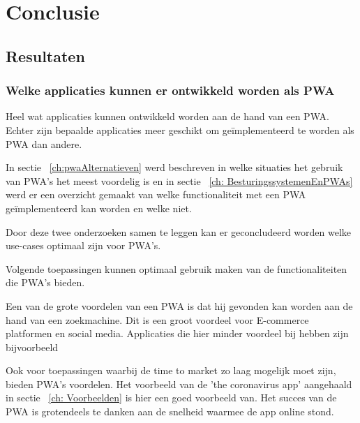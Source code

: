\chapter{Conclusie}
\label{ch:conclusie}

	  

\section{Resultaten}

	\subsection{Welke applicaties kunnen er ontwikkeld worden als PWA}
	
		Heel wat applicaties kunnen ontwikkeld worden aan de hand van een PWA. Echter zijn bepaalde applicaties meer geschikt om geïmplementeerd te worden als PWA dan andere.
		
		In sectie ~\ref{ch:pwaAlternatieven} werd beschreven in welke situaties het gebruik van PWA's het meest voordelig is en in sectie ~\ref{ch: BesturingssystemenEnPWAs} werd er een overzicht gemaakt van welke functionaliteit met een PWA geïmplementeerd kan worden en welke niet.
		
		Door deze twee onderzoeken samen te leggen kan er geconcludeerd worden welke use-cases optimaal zijn voor PWA's.
		
		Volgende toepassingen kunnen optimaal gebruik maken van de functionaliteiten die PWA's bieden.
		
		Een van de grote voordelen van een PWA is dat hij gevonden kan worden aan de hand van een zoekmachine. Dit is een groot voordeel voor E-commerce platformen en social media.
		Applicaties die hier minder voordeel bij hebben zijn bijvoorbeeld 
		
		Ook voor toepassingen waarbij de time to market zo laag mogelijk moet zijn, bieden PWA's voordelen. Het voorbeeld van de 'the coronavirus app' aangehaald in sectie ~\ref{ch: Voorbeelden} is hier een goed voorbeeld van. Het succes van de PWA is grotendeels te danken aan de snelheid waarmee de app online stond.

